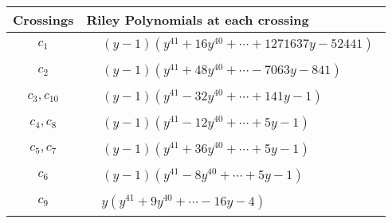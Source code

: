 \documentclass[1p]{elsarticle_modified}
\theoremstyle{definition}
\begin{document}
\begin{tabular}{m{50pt}|m{274pt}}
Crossings & \hspace{64pt}Riley Polynomials at each crossing \\
\hline $$\begin{aligned}c_{1}\end{aligned}$$&$\begin{aligned}
&(y-1)(y^{41}+16 y^{40}+\cdots+1271637 y-52441)
\end{aligned}$\\
\hline $$\begin{aligned}c_{2}\end{aligned}$$&$\begin{aligned}
&(y-1)(y^{41}+48 y^{40}+\cdots-7063 y-841)
\end{aligned}$\\
\hline $$\begin{aligned}c_{3},c_{10}\end{aligned}$$&$\begin{aligned}
&(y-1)(y^{41}-32 y^{40}+\cdots+141 y-1)
\end{aligned}$\\
\hline $$\begin{aligned}c_{4},c_{8}\end{aligned}$$&$\begin{aligned}
&(y-1)(y^{41}-12 y^{40}+\cdots+5 y-1)
\end{aligned}$\\
\hline $$\begin{aligned}c_{5},c_{7}\end{aligned}$$&$\begin{aligned}
&(y-1)(y^{41}+36 y^{40}+\cdots+5 y-1)
\end{aligned}$\\
\hline $$\begin{aligned}c_{6}\end{aligned}$$&$\begin{aligned}
&(y-1)(y^{41}-8 y^{40}+\cdots+5 y-1)
\end{aligned}$\\
\hline $$\begin{aligned}c_{9}\end{aligned}$$&$\begin{aligned}
&y(y^{41}+9 y^{40}+\cdots-16 y-4)
\end{aligned}$\\
\hline
\end{tabular}
\vskip 2pc
\end{document}
